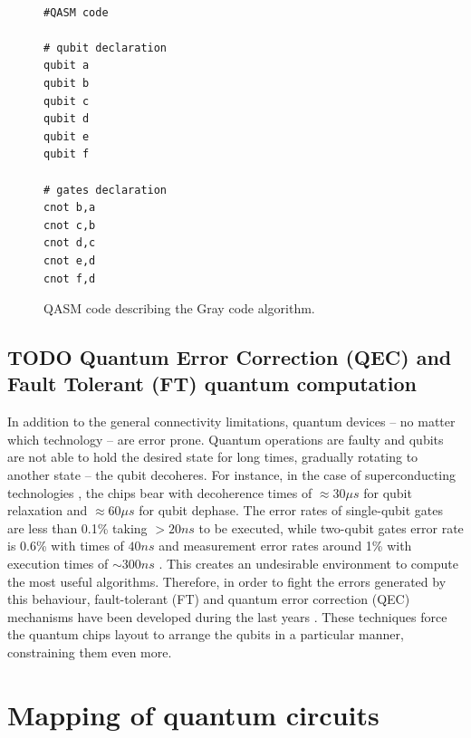 \begin{figure}
\centering
\begin{minipage}{.45\textwidth}

\begin{verbatim}

#QASM code

# qubit declaration
qubit a
qubit b
qubit c
qubit d
qubit e
qubit f

# gates declaration
cnot b,a
cnot c,b
cnot d,c
cnot e,d
cnot f,d

\end{verbatim}

\caption{QASM code describing the Gray code algorithm.}
\label{code:qasm_gray_code}
\end{minipage}
\end{figure}
\subsection*{{\bfseries\sffamily TODO} Quantum Error Correction (QEC) and Fault Tolerant (FT) quantum computation}
\label{sec:org4902661}

In addition to the general connectivity limitations, quantum devices -- no matter which technology -- are error prone.
Quantum operations are faulty and qubits are not able to hold the desired state for long times, gradually rotating to another state -- the qubit decoheres.
For instance, in the case of superconducting technologies \cite{O_Brien_2017}, the chips bear with decoherence times of \(\approx 30 \mu s\) for qubit relaxation and \(\approx 60 \mu s\) for qubit dephase.
The error rates of single-qubit gates are less than 0.1\% taking \(> 20 ns\) to be executed, while two-qubit gates error rate is 0.6\% with times of \(40 ns\) and measurement error rates around 1\% with execution times of \(\sim 300 ns\) \cite{O_Brien_2017,Versluis_2017}.
This creates an undesirable environment to compute the most useful algorithms.
Therefore, in order to fight the errors generated by this behaviour, fault-tolerant (FT) and quantum error correction (QEC) mechanisms have been developed during the last years \cite{Nielsen_2009}.
These techniques force the quantum chips layout to arrange the qubits in a particular manner, constraining them even more.

\section*{Mapping of quantum circuits}
\label{sec:orgb7bb661}

